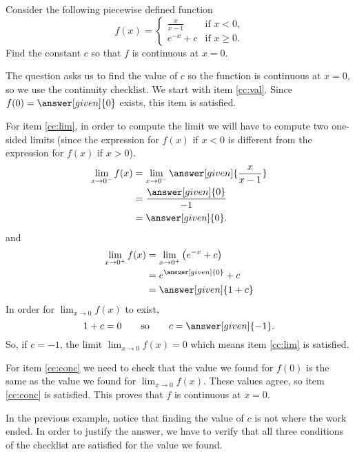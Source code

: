 \documentclass{ximera}
\begin{document}
\begin{example}
	Consider the following piecewise defined function
	\[ f(x) = 
	\begin{cases}
	  	\frac{x}{x-1} &\text{if $x<0$,}\\
	  	e^{-x} + c &\text{if $x\ge 0$}.
	\end{cases} \]
	Find the constant $c$ so that $f$ is continuous at $x=0$.

	\begin{explanation}
		The question asks us to find the value of $c$ so the function is continuous at $x=0$, so we use the continuity checklist.
		We start with item \ref{cc:val}. Since $f(0) = \answer[given]{0}$ exists, this item is satisfied.

		For item \ref{cc:lim}, in order to compute the limit we will have to compute two one-sided limits 
		(since the expression for  $f(x)$ if $x<0$ is  different from the expression for $f(x)$ if $x>0$).
		  \begin{align*}
			    \lim_{x\to 0^-} f(x) &= \lim_{x\to 0^-}\answer[given]{\frac{x}{x-1}}\\
				    &= \frac{\answer[given]{0}}{-1}\\
		    			&=\answer[given]{0}.
		  \end{align*}
		and
		  \begin{align*}
		  	  \lim_{x\to 0^+} f(x) &= \lim_{x\to 0^+}\left(e^{-x}+c\right)\\
		    		&= e^{\answer[given]{0}} + c\\
		    		&= \answer[given]{1+ c}
		  \end{align*}
		  In order for $\displaystyle \lim_{x\to 0} f(x)$ to exist, 
		  \[
		  1 + c = 0\qquad\text{so}\qquad c = \answer[given]{-1}.
		  \]
		  So, if $c=-1$, the limit $\displaystyle \lim_{x\to 0} f(x)=0$ which means item \ref{cc:lim} is satisfied. 
		  
		  For item \ref{cc:conc} we need to check that the value we found for $f(0)$ is the same as the value we found for 
		  $\displaystyle \lim_{x\to 0}f(x)$. These values agree, so item \ref{cc:conc} is satisfied.
		This proves that $f$ is continuous at $x=0$.
	\end{explanation}
\end{example}
\begin{warning}
	In the previous example, notice that finding the value of $c$ is not where the work ended. In order to justify the answer, we have to verify
	that all three conditions of the checklist are satisfied for the value we found. 
\end{warning}
\end{document}
